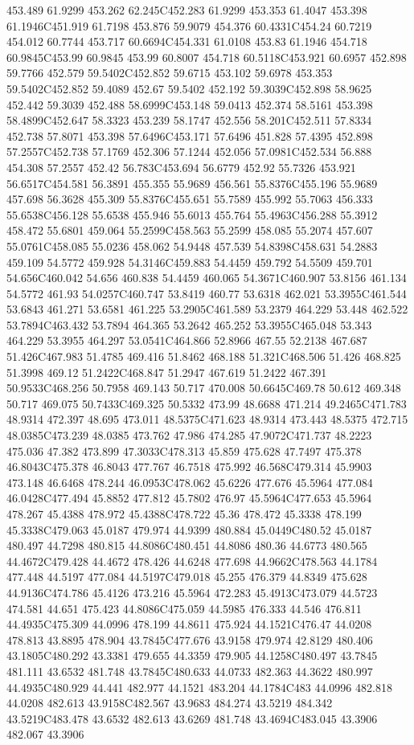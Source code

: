 453.489 61.9299 453.262 62.245C452.283 61.9299 453.353 61.4047 453.398 61.1946C451.919 61.7198 453.876 59.9079 454.376 60.4331C454.24 60.7219 454.012 60.7744 453.717 60.6694C454.331 61.0108 453.83 61.1946 454.718 60.9845C453.99 60.9845 453.99 60.8007 454.718 60.5118C453.921 60.6957 452.898 59.7766 452.579 59.5402C452.852 59.6715 453.102 59.6978 453.353 59.5402C452.852 59.4089 452.67 59.5402 452.192 59.3039C452.898 58.9625 452.442 59.3039 452.488 58.6999C453.148 59.0413 452.374 58.5161 453.398 58.4899C452.647 58.3323 453.239 58.1747 452.556 58.201C452.511 57.8334 452.738 57.8071 453.398 57.6496C453.171 57.6496 451.828 57.4395 452.898 57.2557C452.738 57.1769 452.306 57.1244 452.056 57.0981C452.534 56.888 454.308 57.2557 452.42 56.783C453.694 56.6779 452.92 55.7326 453.921 56.6517C454.581 56.3891 455.355 55.9689 456.561 55.8376C455.196 55.9689 457.698 56.3628 455.309 55.8376C455.651 55.7589 455.992 55.7063 456.333 55.6538C456.128 55.6538 455.946 55.6013 455.764 55.4963C456.288 55.3912 458.472 55.6801 459.064 55.2599C458.563 55.2599 458.085 55.2074 457.607 55.0761C458.085 55.0236 458.062 54.9448 457.539 54.8398C458.631 54.2883 459.109 54.5772 459.928 54.3146C459.883 54.4459 459.792 54.5509 459.701 54.656C460.042 54.656 460.838 54.4459 460.065 54.3671C460.907 53.8156 461.134 54.5772 461.93 54.0257C460.747 53.8419 460.77 53.6318 462.021 53.3955C461.544 53.6843 461.271 53.6581 461.225 53.2905C461.589 53.2379 464.229 53.448 462.522 53.7894C463.432 53.7894 464.365 53.2642 465.252 53.3955C465.048 53.343 464.229 53.3955 464.297 53.0541C464.866 52.8966 467.55 52.2138 467.687 51.426C467.983 51.4785 469.416 51.8462 468.188 51.321C468.506 51.426 468.825 51.3998 469.12 51.2422C468.847 51.2947 467.619 51.2422 467.391 50.9533C468.256 50.7958 469.143 50.717 470.008 50.6645C469.78 50.612 469.348 50.717 469.075 50.7433C469.325 50.5332 473.99 48.6688 471.214 49.2465C471.783 48.9314 472.397 48.695 473.011 48.5375C471.623 48.9314 473.443 48.5375 472.715 48.0385C473.239 48.0385 473.762 47.986 474.285 47.9072C471.737 48.2223 475.036 47.382 473.899 47.3033C478.313 45.859 475.628 47.7497 475.378 46.8043C475.378 46.8043 477.767 46.7518 475.992 46.568C479.314 45.9903 473.148 46.6468 478.244 46.0953C478.062 45.6226 477.676 45.5964 477.084 46.0428C477.494 45.8852 477.812 45.7802 476.97 45.5964C477.653 45.5964 478.267 45.4388 478.972 45.4388C478.722 45.36 478.472 45.3338 478.199 45.3338C479.063 45.0187 479.974 44.9399 480.884 45.0449C480.52 45.0187 480.497 44.7298 480.815 44.8086C480.451 44.8086 480.36 44.6773 480.565 44.4672C479.428 44.4672 478.426 44.6248 477.698 44.9662C478.563 44.1784 477.448 44.5197 477.084 44.5197C479.018 45.255 476.379 44.8349 475.628 44.9136C474.786 45.4126 473.216 45.5964 472.283 45.4913C473.079 44.5723 474.581 44.651 475.423 44.8086C475.059 44.5985 476.333 44.546 476.811 44.4935C475.309 44.0996 478.199 44.8611 475.924 44.1521C476.47 44.0208 478.813 43.8895 478.904 43.7845C477.676 43.9158 479.974 42.8129 480.406 43.1805C480.292 43.3381 479.655 44.3359 479.905 44.1258C480.497 43.7845 481.111 43.6532 481.748 43.7845C480.633 44.0733 482.363 44.3622 480.997 44.4935C480.929 44.441 482.977 44.1521 483.204 44.1784C483 44.0996 482.818 44.0208 482.613 43.9158C482.567 43.9683 484.274 43.5219 484.342 43.5219C483.478 43.6532 482.613 43.6269 481.748 43.4694C483.045 43.3906 482.067 43.3906 